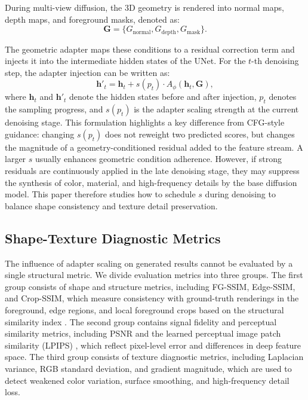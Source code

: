 \documentclass[times,twocolumn,final]{elsarticle}
\begin{document}
During multi-view diffusion, the 3D geometry is rendered into normal maps, depth maps, and foreground masks, denoted as:
\begin{equation}
\mathbf{G} = \{G_\text{normal}, G_\text{depth}, G_\text{mask}\}.
\end{equation}

The geometric adapter maps these conditions to a residual correction term and injects it into the intermediate hidden states of the UNet. For the $t$-th denoising step, the adapter injection can be written as:
\begin{equation}
\mathbf{h}'_t = \mathbf{h}_t + s(p_t) \cdot A_\phi(\mathbf{h}_t, \mathbf{G}),
\label{eq:injection}
\end{equation}
where $\mathbf{h}_t$ and $\mathbf{h}'_t$ denote the hidden states before and after injection, $p_t$ denotes the sampling progress, and $s(p_t)$ is the adapter scaling strength at the current denoising stage. This formulation highlights a key difference from CFG-style guidance: changing $s(p_t)$ does not reweight two predicted scores, but changes the magnitude of a geometry-conditioned residual added to the feature stream. A larger $s$ usually enhances geometric condition adherence. However, if strong residuals are continuously applied in the late denoising stage, they may suppress the synthesis of color, material, and high-frequency details by the base diffusion model. This paper therefore studies how to schedule $s$ during denoising to balance shape consistency and texture detail preservation.

\subsection{Shape-Texture Diagnostic Metrics}
\label{subsec:metrics}

The influence of adapter scaling on generated results cannot be evaluated by a single structural metric. We divide evaluation metrics into three groups. The first group consists of shape and structure metrics, including FG-SSIM, Edge-SSIM, and Crop-SSIM, which measure consistency with ground-truth renderings in the foreground, edge regions, and local foreground crops based on the structural similarity index \cite{wang2004ssim}. The second group contains signal fidelity and perceptual similarity metrics, including PSNR and the learned perceptual image patch similarity (LPIPS) \cite{zhang2018lpips}, which reflect pixel-level error and differences in deep feature space. The third group consists of texture diagnostic metrics, including Laplacian variance, RGB standard deviation, and gradient magnitude, which are used to detect weakened color variation, surface smoothing, and high-frequency detail loss.
\end{document}
